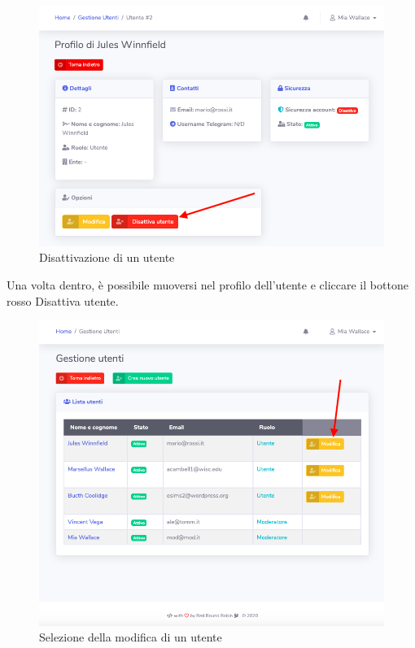 	\begin{figure}[H]
		\centering
		\includegraphics[scale=0.600]{res/images/mod/elimUtente.png}
		\caption{Disattivazione di un utente}
	\end{figure}
		Una volta dentro, è possibile muoversi nel profilo dell'utente e cliccare il bottone rosso Disattiva utente.
		\begin{figure}[H]
		\centering
		\includegraphics[scale=0.600]{res/images/mod/selModUtente.png}
		\caption{Selezione della modifica di un utente}
	\end{figure}
